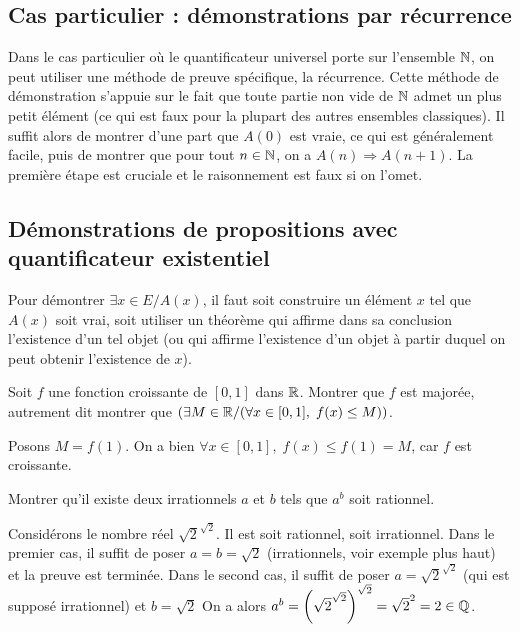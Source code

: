 {\subsection{Cas particulier : démonstrations par récurrence}

Dans le cas particulier où le quantificateur universel porte sur l'ensemble $\mathbb{N}$, on peut utiliser une méthode de preuve spécifique, la récurrence. Cette méthode de démonstration s'appuie sur le fait que toute partie non vide de $\mathbb{N}$ admet un plus petit élément (ce qui est faux pour la plupart des autres ensembles classiques). Il suffit alors de montrer d'une part que $A(0)$ est vraie, ce qui est généralement facile, puis de montrer que pour tout $n \in\mathbb{N}$, on a $A(n) \Rightarrow A(n+1)$. La première étape est cruciale et le raisonnement est faux si on l'omet.


\subsection{Démonstrations de propositions avec quantificateur existentiel}

Pour démontrer \og$\exists x\in E\slash A(x)$, il faut soit construire un élément $x$ tel que $A(x)$ soit vrai, soit utiliser un théorème qui affirme dans sa conclusion l'existence d'un tel objet (ou qui affirme l'existence d'un objet à partir duquel on peut obtenir l'existence de $x$).

\begin{exemple}
Soit $f$ une fonction croissante de $[0,1]$ dans $\mathbb{R}$. Montrer que $f$ est majorée, autrement dit montrer que $(\exists M\in\mathbb{R}\slash (\forall x\in[0,1],\;f(x)\leq M))$.
\begin{red}
Posons $M = f(1)$. On a bien $\forall x\in[0,1],\;f(x)\leq f(1)= M$, car $f$ est croissante.
\end{red}
\end{exemple}

\begin{exemple}
Montrer qu'il existe deux irrationnels $a$ et $b$ tels que $a^b$ soit rationnel.
\begin{red}
Considérons le nombre réel $\sqrt{2}^{\sqrt{2}}$. Il est soit rationnel, soit irrationnel. Dans le premier cas, il suffit de poser $a=b=\sqrt{2}$ (irrationnels, voir exemple plus haut) et la preuve est terminée. Dans le second cas, il suffit de poser $a=\sqrt{2}^{\sqrt{2}}$ (qui est supposé irrationnel) et $b=\sqrt{2}$ On a alors $a^b = \left(\sqrt{2}^{\sqrt{2}}\right)^{\sqrt{2}} = \sqrt{2}^2 = 2 \in \mathbb{Q}$.
\end{red}
\end{exemple}

}
